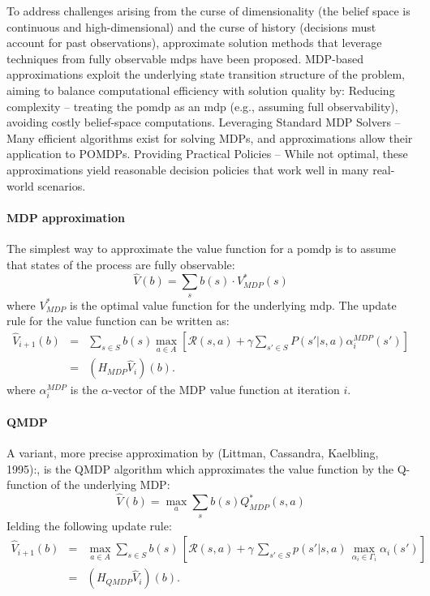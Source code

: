 To address challenges arising from the curse of dimensionality (the belief space is continuous and high-dimensional) 
and the curse of history (decisions must account for past observations), approximate solution methods that  
leverage techniques from fully observable \glspl{mdp} have been proposed. 
MDP-based approximations exploit the underlying state transition structure of the problem, aiming 
to balance computational efficiency with solution quality by:
Reducing complexity – treating the \gls{pomdp} as an \gls{mdp} (e.g., assuming full observability), avoiding costly belief-space computations.
Leveraging Standard MDP Solvers – Many efficient algorithms exist for solving MDPs, and approximations allow their application to POMDPs.
Providing Practical Policies – While not optimal, these approximations yield reasonable decision policies that work well in many real-world scenarios.

\paragraph{MDP approximation}
The simplest way to approximate the value function for a \gls{pomdp} is to assume that states of 
the process are fully observable: $$\hat{V}(b) = \sum_s b(s)\cdot V_{MDP}^*(s)$$
where $V_{MDP}^*$ is the optimal value function for the underlying \gls{mdp}.
The update rule for the value function can be written as:
\[
\begin{array}{lll}
\widehat{V}_{i+1}(b) & = & \displaystyle\sum_{s\in S}b(s)\max\limits_{a\in A}\left[\mathcal{R}(s,a)+\gamma\sum_{s'\in S}P(s'|s,a)\alpha_{i}^{MDP}(s')\right]\\
 & = & \displaystyle(H_{MDP}\widehat{V}_{i})(b).
\end{array}
\]
where $\alpha_{i}^{MDP}$ is the $\alpha$-vector of the MDP value function at iteration $i$.
\paragraph{QMDP} A variant, more precise approximation by (Littman,
Cassandra, Kaelbling, 1995):, is the QMDP algorithm  
which approximates the value function by the Q-function of the underlying MDP:
$$\hat{V}(b) = \max_a \sum_s b(s) Q_{MDP}^*(s,a)$$
Ielding the following update rule:
\[
\begin{array}{rcl}
\widehat{V}_{i+1}(b) & = & \max\limits_{a\in A}\sum\limits_{s\in S}b(s)\,\left[\mathcal{R}(s,a)+\gamma\,\sum\limits_{s'\in S}p(s'|s,a)\,\max\limits_{\alpha_{i}\in\Gamma_{i}}\alpha_{i}(s')\right]\\
 & = & (H_{QMDP}\widehat{V}_{i})(b).
\end{array}
\]


